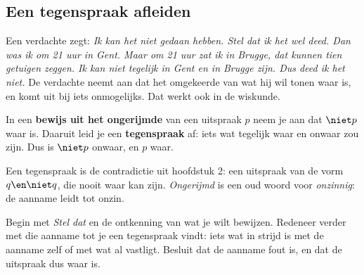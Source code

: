 \subsection{Een tegenspraak afleiden}

Een verdachte zegt: \textit{Ik kan het niet gedaan hebben. Stel dat ik het wel deed. Dan was ik om 21 uur in Gent. Maar om 21 uur zat ik in Brugge, dat kunnen tien getuigen zeggen. Ik kan niet tegelijk in Gent en in Brugge zijn. Dus deed ik het niet.} De verdachte neemt aan dat het omgekeerde van wat hij wil tonen waar is, en komt uit bij iets onmogelijks. Dat werkt ook in de wiskunde.


\begin{theorie}
In een \textbf{\textcolor{accent}{bewijs uit het ongerijmde}} van een uitspraak $p$ neem je aan dat $\niet p$ waar is. Daaruit leid je een \textbf{\textcolor{accent}{tegenspraak}} af: iets wat tegelijk waar en onwaar zou zijn. Dus is $\niet p$ onwaar, en $p$ waar.
\end{theorie}

Een tegenspraak is de contradictie uit hoofdstuk 2: een uitspraak van de vorm $q \en \niet q$, die nooit waar kan zijn. \textit{Ongerijmd} is een oud woord voor \textit{onzinnig}: de aanname leidt tot onzin.

\begin{werkwijze}
Begin met \textit{Stel dat} en de ontkenning van wat je wilt bewijzen. Redeneer verder met die aanname tot je een tegenspraak vindt: iets wat in strijd is met de aanname zelf of met wat al vastligt. Besluit dat de aanname fout is, en dat de uitspraak dus waar is.
\end{werkwijze}

\begin{oefeningen}
\end{oefeningen}

